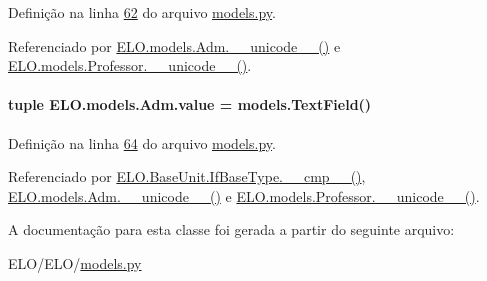Definição na linha \hyperlink{ELO_2models_8py_source_l00062}{62} do arquivo \hyperlink{ELO_2models_8py_source}{models.\-py}.



Referenciado por \hyperlink{classELO_1_1models_1_1Adm_a3541c3ae12b8d2da3f44ac6be00a23e6}{E\-L\-O.\-models.\-Adm.\-\_\-\-\_\-unicode\-\_\-\-\_\-()} e \hyperlink{classELO_1_1models_1_1Professor_aefc9d63d429e19ec3487a7879879f29d}{E\-L\-O.\-models.\-Professor.\-\_\-\-\_\-unicode\-\_\-\-\_\-()}.

\hypertarget{classELO_1_1models_1_1Adm_a98f249c493fbcbcd347297437a098212}{
\paragraph[{value}]{\setlength{\rightskip}{0pt plus 5cm}tuple E\-L\-O.\-models.\-Adm.\-value = models.\-Text\-Field()\hspace{0.3cm}{\ttfamily [static]}}}\label{classELO_1_1models_1_1Adm_a98f249c493fbcbcd347297437a098212}


Definição na linha \hyperlink{ELO_2models_8py_source_l00064}{64} do arquivo \hyperlink{ELO_2models_8py_source}{models.\-py}.



Referenciado por \hyperlink{classELO_1_1BaseUnit_1_1IfBaseType_a69c338f6f1574bd3524e9d59ebc17a7c}{E\-L\-O.\-Base\-Unit.\-If\-Base\-Type.\-\_\-\-\_\-cmp\-\_\-\-\_\-()}, \hyperlink{classELO_1_1models_1_1Adm_a3541c3ae12b8d2da3f44ac6be00a23e6}{E\-L\-O.\-models.\-Adm.\-\_\-\-\_\-unicode\-\_\-\-\_\-()} e \hyperlink{classELO_1_1models_1_1Professor_aefc9d63d429e19ec3487a7879879f29d}{E\-L\-O.\-models.\-Professor.\-\_\-\-\_\-unicode\-\_\-\-\_\-()}.



A documentação para esta classe foi gerada a partir do seguinte arquivo\-:\begin{DoxyCompactItemize}
\item 
E\-L\-O/\-E\-L\-O/\hyperlink{ELO_2models_8py}{models.\-py}\end{DoxyCompactItemize}
